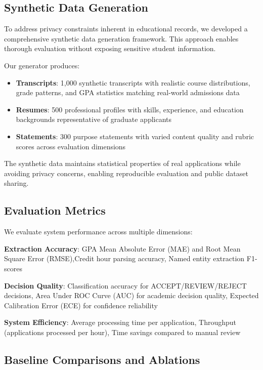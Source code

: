 \documentclass{article}
\begin{document}
\subsection{Synthetic Data Generation}

To address privacy constraints inherent in educational records, we developed a comprehensive synthetic data generation framework. This approach enables thorough evaluation without exposing sensitive student information.

Our generator produces:
\begin{itemize}
    \item \textbf{Transcripts}: 1,000 synthetic transcripts with realistic course distributions, grade patterns, and GPA statistics matching real-world admissions data
    \item \textbf{Resumes}: 500 professional profiles with skills, experience, and education backgrounds representative of graduate applicants  
    \item \textbf{Statements}: 300 purpose statements with varied content quality and rubric scores across evaluation dimensions
\end{itemize}

The synthetic data maintains statistical properties of real applications while avoiding privacy concerns, enabling reproducible evaluation and public dataset sharing.

\subsection{Evaluation Metrics}

We evaluate system performance across multiple dimensions:

\textbf{Extraction Accuracy}: GPA Mean Absolute Error (MAE) and Root Mean Square Error (RMSE),Credit hour parsing accuracy, Named entity extraction F1-scores
\vspace{\baselineskip}

\textbf{Decision Quality}: Classification accuracy for ACCEPT/REVIEW/REJECT decisions, Area Under ROC Curve (AUC) for academic decision quality, Expected Calibration Error (ECE) for confidence reliability
\vspace{\baselineskip}

\textbf{System Efficiency}: Average processing time per application, Throughput (applications processed per hour), Time savings compared to manual review


\subsection{Baseline Comparisons and Ablations}
\end{document}
